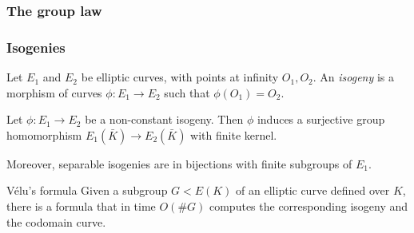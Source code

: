 \documentclass{beamer}
\begin{document}
    \begin{frame}
        \frametitle{The group law}
        \begin{center}
        \end{center}
    \end{frame}

    \begin{frame}
        \frametitle{Isogenies}
        
        \begin{definition}
            Let $E_1$ and $E_2$ be elliptic curves, with points at infinity $O_1,O_2$. An \emph{isogeny} is a morphism of curves $\phi:E_1\to E_2$ such that $\phi(O_1)=O_2$.
        \end{definition}
    
        \begin{theorem}
            Let $\phi:E_1 \to E_2$ be a non-constant isogeny. Then $\phi$ induces a surjective group homomorphism $E_1(\bar K)\to E_2(\bar K)$ with finite kernel.
            
            Moreover, separable isogenies are in bijections with finite subgroups of $E_1$.
        \end{theorem}
    
        \begin{block}{Vélu's formula}
            Given a subgroup $G<E(K)$ of an elliptic curve defined over $K$, there is a formula that in time $O(\# G)$ computes the corresponding isogeny and the codomain curve.
        \end{block}
    \end{frame}
\end{document}
